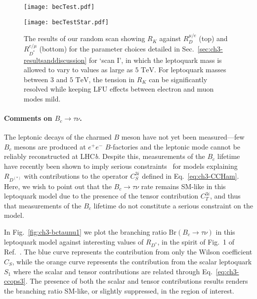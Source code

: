 \begin{figure}
  \centering
  \begin{minipage}[t]{1\linewidth}
    \centering \texttt{[image: becTest.pdf]}
  \end{minipage}
  \hfill
  \begin{minipage}[t]{1\linewidth}
    \centering \texttt{[image: becTestStar.pdf]}
  \end{minipage}
  \caption[The results of our random scan showing $R_K$ against $R_D^{\mu/e}$
  (top) and $R^{e/\mu}_{D^*}$ (bottom) for the parameter choices detailed in
  Sec.~\ref{sec:ch3-resultsanddiscussion} for `scan I', in which the leptoquark mass
  is allowed to vary to values as large as $5 \text{ TeV}$.]{The results of our
    random scan showing $R_K$ against $R_D^{\mu/e}$ (top) and $R^{e/\mu}_{D^*}$
    (bottom) for the parameter choices detailed in
    Sec.~\ref{sec:ch3-resultsanddiscussion} for `scan I', in which the leptoquark
    mass is allowed to vary to values as large as $5 \text{ TeV}$. For
    leptoquark masses between $3$ and $5 \text{ TeV}$, the tension in $R_K$ can
    be significantly resolved while keeping LFU effects between electron and
    muon modes mild.}
  \label{fig:ch3-LFUratios}
\end{figure}

\paragraph{Comments on $B_c \to \tau \nu$.} The leptonic decays of the charmed
$B$ meson have not yet been measured---few $B_c$ mesons are produced at $e^+e^-$
$B$-factories and the leptonic mode cannot be reliably reconstructed at
LHC\textit{b}. Despite this, measurements of the $B_c$ lifetime have recently
been shown to imply serious constraints~\cite{Li:2016vvp, Alonso:2016oyd} for
models explaining $R_{D^{(*)}}$ with contributions to the operator $C_S^{3i}$
defined in Eq.~\eqref{eq:ch3-CCHam}. Here, we wish to point out that the $B_c \to
\tau \nu$ rate remains SM-like in this leptoquark model due to the presence of
the tensor contribution $C_T^{3i}$, and thus that measurements of the $B_c$
lifetime do not constitute a serious constraint on the model.

In Fig.~\ref{fig:ch3-bctaunu1} we plot the branching ratio $\text{Br}(B_c \to \tau
\nu)$ in this leptoquark model against interesting values of $R_{D^*}$, in the
spirit of Fig.~1 of Ref.~\cite{Alonso:2016oyd}. The blue curve represents the
contribution from only the Wilson coefficient $C_S$, while the orange curve
represents the contribution from the scalar leptoquark $S_{1}$ where the scalar
and tensor contributions are related through Eq.~\eqref{eq:ch3-ccops3}. The presence
of both the scalar and tensor contributions results renders the branching ratio
SM-like, or slightly suppressed, in the region of interest.


